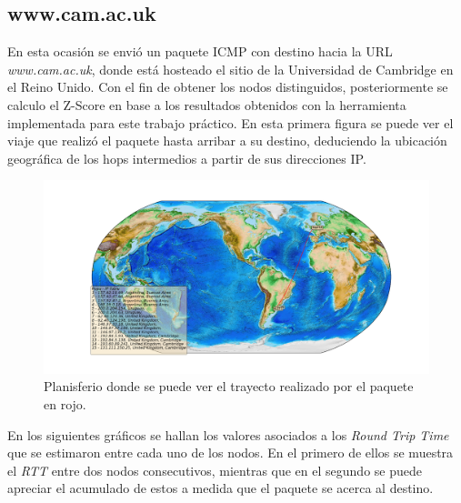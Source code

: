 \subsection{www.cam.ac.uk}

En esta ocasión se envió un paquete ICMP con destino hacia la URL \textit{www.cam.ac.uk}, donde está hosteado el sitio de la Universidad de Cambridge en el Reino Unido. Con el fin de obtener los nodos distinguidos, posteriormente se calculo el Z-Score en base a los resultados obtenidos con la herramienta implementada para este trabajo práctico.
En esta primera figura se puede ver el viaje que realizó el paquete hasta arribar a su destino, deduciendo la ubicación geográfica de los hops intermedios a partir de sus direcciones IP.

\begin{landscape}
\begin{figure}[H]
  \centering	
	\includegraphics[scale=0.5]{../cambridge-experiment/figure_1.png}
  \caption{Planisferio donde se puede ver el trayecto realizado por el paquete en rojo.}
	\label{fig:histo-src-sitiotrabajo}
\end{figure}
\end{landscape}

En los siguientes gráficos se hallan los valores asociados a los \textit{Round Trip Time} que se estimaron entre cada uno de los nodos. En el primero de ellos se muestra el \textit{RTT} entre dos nodos consecutivos, mientras que en el segundo se puede apreciar el acumulado de estos a medida que el paquete se acerca al destino.

